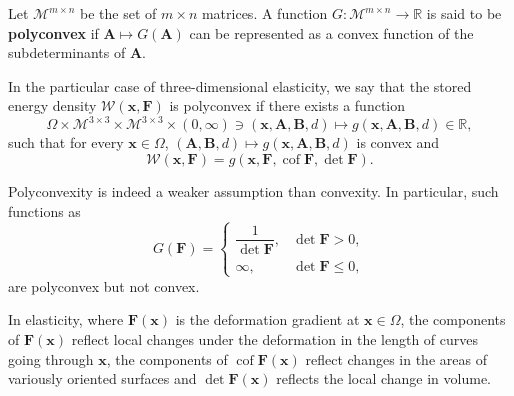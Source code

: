\begin{Definition}
\label{def:polyconvex-function}
Let $\mathcal{M}^{m\times n}$ be the set of $m\times n$ matrices. A function $G:\mathcal{M}^{m\times n}\to\mathbb{R}$ is said to be \textbf{polyconvex} if $\bm{A}\mapsto G(\bm{A})$ can be represented as a convex function of the subdeterminants of $\bm{A}$.
\end{Definition}

In the particular case of three-dimensional elasticity, we say that the stored energy density $\mathcal{W}(\bm{x},\bm{F})$ is polyconvex if there exists a function
\begin{equation}\label{eq:polyconvex-elastic-energy-convex-representation-map}
\Omega\times\mathcal{M}^{3\times3}\times\mathcal{M}^{3\times3}\times(0,\infty)\ni(\bm{x},\bm{A},\bm{B},d)\mapsto g(\bm{x},\bm{A},\bm{B},d)\in\mathbb{R},
\end{equation}
such that for every $\bm{x}\in\Omega$, $(\bm{A},\bm{B},d)\mapsto g(\bm{x},\bm{A},\bm{B},d)$ is convex and
\begin{equation}\label{eq:polyconvex-elastic-energy-gradient-minor-representation}
\mathcal{W}(\bm{x},\bm{F})=g(\bm{x},\bm{F},\operatorname{cof}\bm{F},\det\bm{F}).
\end{equation}


\begin{Remark}
\label{rem:polyconvexity-weaker-than-convexity}
Polyconvexity is indeed a weaker assumption than convexity. In particular, such functions as
\begin{equation}\label{eq:polyconvex-nonconvex-inverse-determinant-example}
G(\bm{F})=\begin{cases}\dfrac{1}{\det\bm{F}},&\det\bm{F}>0,\\\infty,&\det\bm{F}\leq0,\end{cases}
\end{equation}
are polyconvex but not convex.
\end{Remark}

\begin{Remark}
\label{rem:deformation-minors-geometric-meaning}
In elasticity, where $\bm{F}(\bm{x})$ is the deformation gradient at $\bm{x}\in\Omega$, the components of $\bm{F}(\bm{x})$ reflect local changes under the deformation in the length of curves going through $\bm{x}$, the components of $\operatorname{cof}\bm{F}(\bm{x})$ reflect changes in the areas of variously oriented surfaces and $\det\bm{F}(\bm{x})$ reflects the local change in volume.
\end{Remark}

